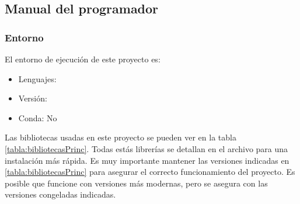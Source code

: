 \subsection{Manual del programador}

\subsubsection{Entorno}

El entorno de ejecución de este proyecto es:

\begin{itemize}
  \item Lenguajes: 
  \item Versión: 
  \item Conda: No
\end{itemize}

Las bibliotecas usadas en este proyecto se pueden ver en la tabla \ref{tabla:bibliotecasPrinc}. Todas estás librerías se detallan en el archivo  para una instalación más rápida. Es muy importante mantener las versiones indicadas en \ref{tabla:bibliotecasPrinc} para asegurar el correcto funcionamiento del proyecto. Es posible que funcione con versiones más modernas, pero se asegura con las versiones congeladas indicadas.

